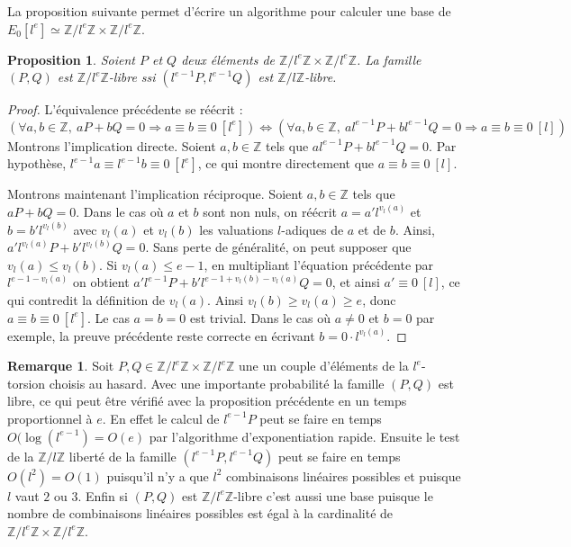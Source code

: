 \documentclass{article}
\theoremstyle{plain}%
\newtheorem{prop}[thm]{Proposition}
\theoremstyle{definition}%
\newtheorem{rem}[thm]{Remarque}
\newcommand{\Z}{\mathbb{Z}}
\begin{document}
La proposition suivante permet d'écrire un algorithme pour calculer une base de 
  $E_0[l^e] \simeq \Z/l^e\Z \times \Z/l^e\Z$.

\begin{prop}
  \label{recherche_base}
  Soient $P$ et $Q$ deux éléments de $\Z/l^e\Z \times \Z/l^e\Z$. 
  La famille $(P, Q)$ est $\Z/l^e\Z $-libre ssi $(l^{e-1}P, l^{e-1}Q)$ est $\Z/l\Z $-libre. 
\end{prop}

\begin{proof}
  L'équivalence précédente se réécrit :
  $$\left( \forall a, b \in \Z,\ aP + bQ = 0 \Rightarrow a \equiv b \equiv 0\ [l^e] \right) \iff \left( \forall a, b \in \Z,\ a l^{e-1}P + b l^{e-1}Q = 0 \Rightarrow a \equiv b \equiv 0\ [l] \right) $$
  Montrons l'implication directe. Soient $a, b\in \Z$ tels que $a l^{e-1}P + b l^{e-1}Q = 0$. 
  Par hypothèse, $l^{e-1}a \equiv l^{e-1}b \equiv 0\ [l^e]$, ce qui montre directement que $a \equiv b \equiv 0\ [l]$. 

  Montrons maintenant l'implication réciproque. Soient $a, b \in \Z$ tels que $aP + bQ = 0$. 
  Dans le cas où $a$ et $b$ sont non nuls, on réécrit $a = a' l^{v_l(a)}$ et $b = b' l^{v_l(b)}$ avec $v_l(a)$ et $v_l(b)$ les valuations $l$-adiques de $a$ et de $b$. 
  Ainsi, $a' l^{v_l(a)}P + b' l^{v_l(b)}Q = 0$. 
  Sans perte de généralité, on peut supposer que $v_l(a) \le v_l(b)$. 
  Si $v_l(a) \le e-1$, en multipliant l'équation précédente par $l^{e-1-v_l(a)}$ on obtient $a' l^{e-1}P + b' l^{e-1 + v_l(b) - v_l(a)}Q = 0$, et ainsi $a' \equiv 0\ [l]$, ce qui contredit la définition de $v_l(a)$. 
  Ainsi $v_l(b) \ge v_l(a) \ge e$, donc $a \equiv b \equiv 0\ [l^e]$. Le cas $a=b=0$ est trivial. Dans le cas où $a\neq0$ et $b=0$ par exemple, la preuve précédente reste correcte en écrivant $b = 0\cdot l^{v_l(a)}$.
\end{proof}

\begin{rem}
  Soit $P, Q\in \Z/l^e\Z \times \Z/l^e\Z$ une un couple d'éléments de la $l^e$-torsion choisis au hasard. Avec une importante probabilité la famille $(P, Q)$ est libre, ce qui peut être vérifié avec la proposition précédente en un temps proportionnel à $e$. En effet le calcul de $l^{e-1}P$ peut se faire en temps $O(\log(l^{e-1}) = O(e)$ par l'algorithme d'exponentiation rapide. Ensuite le test de la $\Z/l\Z$ liberté de la famille $(l^{e-1}P, l^{e-1}Q)$ peut se faire en temps $O(l^2) = O(1)$ puisqu'il n'y a que $l^2$ combinaisons linéaires possibles et puisque $l$ vaut $2$ ou $3$. Enfin si $(P, Q)$ est $\Z/l^e\Z$-libre c'est aussi une base puisque le nombre de combinaisons linéaires possibles est égal à la cardinalité de $\Z/l^e\Z \times \Z/l^e\Z$.
\end{rem}
\end{document}

